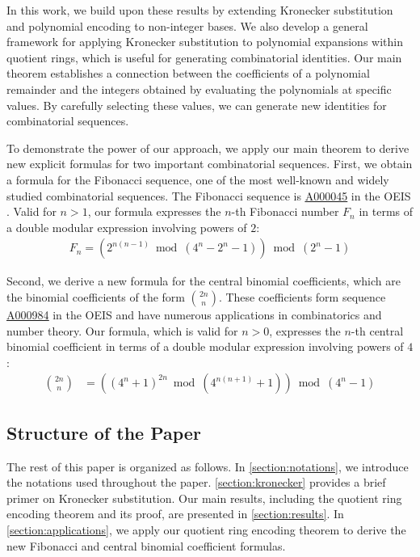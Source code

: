 \documentclass[12pt,reqno]{article}
\theoremstyle{plain}
\theoremstyle{definition}
\newcommand{\seqnum}[1]{\href{https://oeis.org/#1}{\rm \underline{#1}}}
\begin{document}
In this work, we build upon these results by extending Kronecker substitution and polynomial encoding to non-integer bases. We also develop a general framework for applying Kronecker substitution to polynomial expansions within quotient rings, which is useful for generating combinatorial identities. Our main theorem establishes a connection between the coefficients of a polynomial remainder and the integers obtained by evaluating the polynomials at specific values. By carefully selecting these values, we can generate new identities for combinatorial sequences.

To demonstrate the power of our approach, we apply our main theorem to derive new explicit formulas for two important combinatorial sequences. First, we obtain a formula for the Fibonacci sequence, one of the most well-known and widely studied combinatorial sequences. The Fibonacci sequence is \seqnum{A000045} in the OEIS \cite{A000045}. Valid for $n > 1$, our formula expresses the $n$-th Fibonacci number $F_n$ in terms of a double modular expression involving powers of $2$:
\begin{align*}
    F_n = (2^{n(n-1)} \bmod{(4^n-2^n-1)}) \bmod{(2^n-1)}
\end{align*}

Second, we derive a new formula for the central binomial coefficients, which are the binomial coefficients of the form $\binom{2n}{n}$. These coefficients form sequence \seqnum{A000984} in the OEIS \cite{A000984} and have numerous applications in combinatorics and number theory. Our formula, which is valid for $n > 0$, expresses the $n$-th central binomial coefficient in terms of a double modular expression involving powers of $4$:
\begin{align*}
    \binom{2n}{n} &= ((4^n + 1)^{2n} \bmod{(4^{n(n+1)} + 1)}) \bmod{(4^n-1)}
\end{align*}

\subsection{Structure of the Paper}
The rest of this paper is organized as follows. In \cref{section:notations}, we introduce the notations used throughout the paper. \cref{section:kronecker} provides a brief primer on Kronecker substitution. Our main results, including the quotient ring encoding theorem and its proof, are presented in \cref{section:results}. In \cref{section:applications}, we apply our quotient ring encoding theorem to derive the new Fibonacci and central binomial coefficient formulas.
\end{document}
